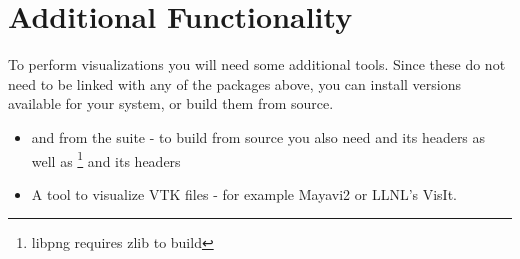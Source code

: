 %
%
%

\section{Additional Functionality}\label{sec:addfunc}
To perform visualizations you will need some additional tools.
Since these do not need to be linked with any of the packages above, you can install versions available for your system, or build them from source.
\begin{itemize}
\item {} and  from the  suite - to build from source you also need  and its headers as well as \footnote{libpng requires zlib to build} and its headers
\item A tool to visualize VTK files - for example Mayavi2 or LLNL's VisIt.
\end{itemize}

